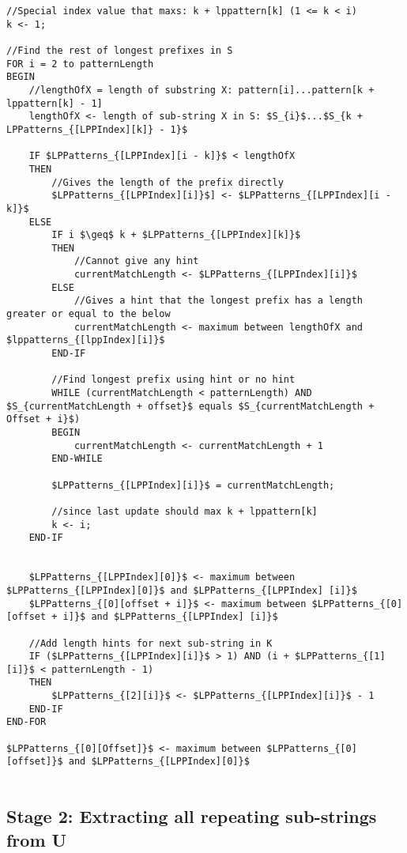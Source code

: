 \documentclass[12pt]{article}
\begin{document}
\begin{flushleft}
\begin{lstlisting}
//Special index value that maxs: k + lppattern[k] (1 <= k < i)
k <- 1;

//Find the rest of longest prefixes in S
FOR i = 2 to patternLength
BEGIN
	//lengthOfX = length of substring X: pattern[i]...pattern[k + lppattern[k] - 1]
	lengthOfX <- length of sub-string X in S: $S_{i}$...$S_{k + LPPatterns_{[LPPIndex][k]} - 1}$
	
	IF $LPPatterns_{[LPPIndex][i - k]}$ < lengthOfX
	THEN
		//Gives the length of the prefix directly
		$LPPatterns_{[LPPIndex][i]}$] <- $LPPatterns_{[LPPIndex][i - k]}$
	ELSE	
		IF i $\geq$ k + $LPPatterns_{[LPPIndex][k]}$
		THEN
			//Cannot give any hint
			currentMatchLength <- $LPPatterns_{[LPPIndex][i]}$
		ELSE
			//Gives a hint that the longest prefix has a length greater or equal to the below
			currentMatchLength <- maximum between lengthOfX and $lppatterns_{[lppIndex][i]}$
		END-IF
		
		//Find longest prefix using hint or no hint
		WHILE (currentMatchLength < patternLength) AND $S_{currentMatchLength + offset}$ equals $S_{currentMatchLength + Offset + i}$)
		BEGIN
			currentMatchLength <- currentMatchLength + 1
		END-WHILE
		
		$LPPatterns_{[LPPIndex][i]}$ = currentMatchLength;
		
		//since last update should max k + lppattern[k]
		k <- i;
	END-IF
	

	$LPPatterns_{[LPPIndex][0]}$ <- maximum between $LPPatterns_{[LPPIndex][0]}$ and $LPPatterns_{[LPPIndex] [i]}$
	$LPPatterns_{[0][offset + i]}$ <- maximum between $LPPatterns_{[0][offset + i]}$ and $LPPatterns_{[LPPIndex] [i]}$
	
	//Add length hints for next sub-string in K
	IF ($LPPatterns_{[LPPIndex][i]}$ > 1) AND (i + $LPPatterns_{[1][i]}$ < patternLength - 1)
	THEN
		$LPPatterns_{[2][i]}$ <- $LPPatterns_{[LPPIndex][i]}$ - 1
	END-IF
END-FOR

$LPPatterns_{[0][Offset]}$ <- maximum between $LPPatterns_{[0][offset]}$ and $LPPatterns_{[LPPIndex][0]}$


\end{lstlisting}
	\newpage	
	\subsection{Stage 2: Extracting all repeating sub-strings from U}
		

\end{flushleft}
\end{document}
